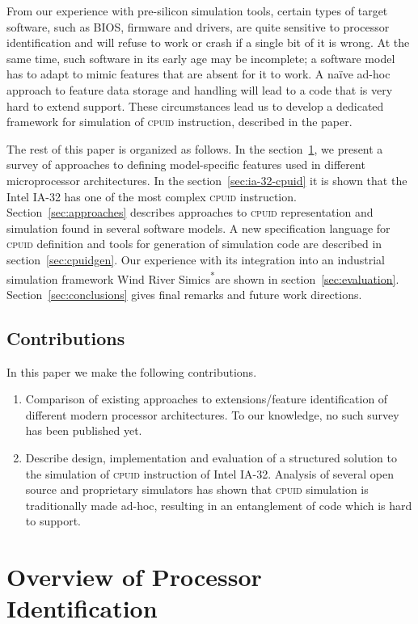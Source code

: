 \documentclass[a4paper,10pt,oneside,unicode]{article}
\newcommand{\cpuid}{\textsc{cpuid} }
\newcommand{\othercopyright}{\textsuperscript{*}}
\begin{document}
From our experience with pre-silicon simulation tools, certain types of target software, such as BIOS, firmware and drivers, are quite sensitive to processor identification and will refuse to work or crash if a single bit of it is wrong. At the same time, such software in its early age may be incomplete; a software model has to adapt to mimic features that are absent for it to work. A naïve ad-hoc approach to feature data storage and handling will lead to a code that is very hard to extend support. These circumstances lead us to develop a dedicated framework for simulation of \cpuid instruction, described in the paper.

The rest of this paper is organized as follows. In the section~\ref{sec:overview}, we present a survey of approaches to defining model-specific features used in different microprocessor architectures. In the section~\ref{sec:ia-32-cpuid} it is shown that the Intel IA-32 has one of the most complex \cpuid instruction. Section~\ref{sec:approaches} describes approaches to \cpuid representation and simulation found in several software models. A new specification language for \cpuid definition and tools for generation of simulation code are described in section~\ref{sec:cpuidgen}. Our experience with its integration  into an industrial simulation framework Wind River Simics\othercopyright are shown in section~\ref{sec:evaluation}. Section~\ref{sec:conclusions} gives final remarks and future work directions.

\subsection{Contributions}

In this paper we make the following contributions.
\begin{enumerate}
\item Comparison of existing approaches to extensions/feature identification of different modern processor architectures. To our knowledge, no such survey has been published yet.
\item Describe design, implementation and evaluation of a structured solution to the simulation of \cpuid instruction of Intel IA-32. Analysis of several open source and proprietary simulators has shown that \cpuid simulation is traditionally made ad-hoc, resulting in an entanglement of code which is hard to support.
\end{enumerate}

\section{Overview of Processor Identification}\label{sec:overview}
\end{document}
